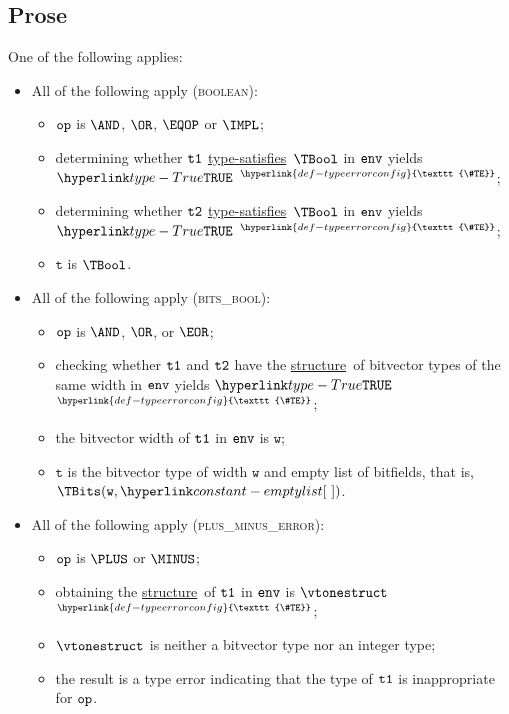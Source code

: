 \documentclass{book}
\newcommand\TypeErrorConfig[0]{\hyperlink{def-typeerrorconfig}{\texttt{\#TE}}}
\newcommand\ProseOrTypeError[0]{\hyperlink{def-proseortypeerror}{$^{\TypeErrorConfig}$}}
\newcommand\structure[0]{\hyperlink{def-structure}{structure}}
\newcommand\typesatisfies[0]{\hyperlink{def-typesatisfies}{type-satisfies}}
\newcommand\vt[0]{\texttt{t}}
\newcommand\vw[0]{\texttt{w}}
\begin{document}
\subsection{Prose}
One of the following applies:
\begin{itemize}
  \item All of the following apply (\textsc{boolean}):
  \begin{itemize}
    \item $\texttt{op}$ is $\AND$, $\OR$, $\EQOP$ or $\IMPL$;
    \item determining whether $\texttt{t1}$ \typesatisfies\ $\TBool$ in $\texttt{env}$ yields $\True$ \ProseOrTypeError;
    \item determining whether $\texttt{t2}$ \typesatisfies\ $\TBool$ in $\texttt{env}$ yields $\True$ \ProseOrTypeError;
    \item $\vt$ is $\TBool$.
  \end{itemize}

  \item All of the following apply (\textsc{bits\_bool}):
  \begin{itemize}
    \item $\texttt{op}$ is $\AND$, $\OR$, or $\EOR$;
    \item checking whether $\texttt{t1}$ and $\texttt{t2}$ have the \structure\ of bitvector types
          of the same width in $\texttt{env}$ yields $\True$ \ProseOrTypeError;
    \item the bitvector width of $\texttt{t1}$ in $\texttt{env}$ is $\vw$;
    \item $\vt$ is the bitvector type of width $\vw$ and empty list of bitfields, that is, \\ $\TBits(\vw, \emptylist)$.
  \end{itemize}

  \item All of the following apply (\textsc{plus\_minus\_error}):
  \begin{itemize}
    \item $\texttt{op}$ is $\PLUS$ or $\MINUS$;
    \item obtaining the \structure\ of $\texttt{t1}$ in $\texttt{env}$ is $\vtonestruct$ \ProseOrTypeError;
    \item $\vtonestruct$ is neither a bitvector type nor an integer type;
    \item the result is a type error indicating that the type of $\texttt{t1}$ is inappropriate for $\texttt{op}$.
  \end{itemize}


\end{itemize}
\end{document}
